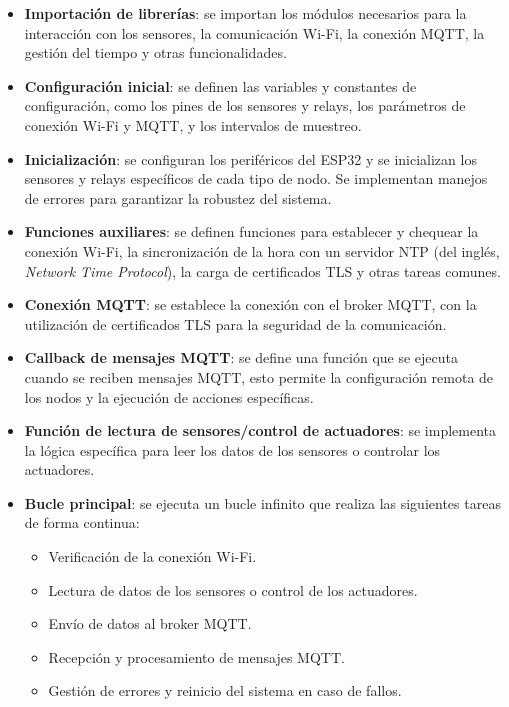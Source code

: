 \begin{itemize}
    \item \textbf{Importación de librerías}: se importan los módulos necesarios para la
          interacción con los sensores, la comunicación Wi-Fi, la conexión MQTT,
          la gestión del tiempo y otras funcionalidades.
    \item \textbf{Configuración inicial}: se definen las variables y constantes de
          configuración, como los pines de los sensores y relays, los parámetros de conexión
          Wi-Fi y MQTT, y los intervalos de muestreo.
    \item \textbf{Inicialización}: se configuran los periféricos
          del ESP32 y se inicializan los sensores y relays específicos de cada
          tipo de nodo. Se implementan manejos de errores para garantizar la
          robustez del sistema.
    \item \textbf{Funciones auxiliares}: se definen funciones para establecer y chequear
          la conexión Wi-Fi, la sincronización de la hora con un servidor NTP (del
          inglés, \textit{Network Time Protocol}), la carga de certificados TLS y otras
          tareas comunes.
    \item \textbf{Conexión MQTT}: se establece la conexión con el broker MQTT,
          con la utilización de certificados TLS para la seguridad de la comunicación.
    \item \textbf{Callback de mensajes MQTT}: se define una función que se ejecuta cuando
          se reciben mensajes MQTT, esto permite la configuración remota de los nodos
          y la ejecución de acciones específicas.
    \item \textbf{Función de lectura de sensores/control de actuadores}: se implementa
          la lógica específica para leer los datos de los sensores o controlar los
          actuadores.
    \item \textbf{Bucle principal}: se ejecuta un bucle infinito que realiza las
          siguientes tareas de forma continua:
          \begin{itemize}
              \item Verificación de la conexión Wi-Fi.
              \item Lectura de datos de los sensores o control de los actuadores.
              \item Envío de datos al broker MQTT.
              \item Recepción y procesamiento de mensajes MQTT.
              \item Gestión de errores y reinicio del sistema en caso de fallos.
          \end{itemize}
\end{itemize}

